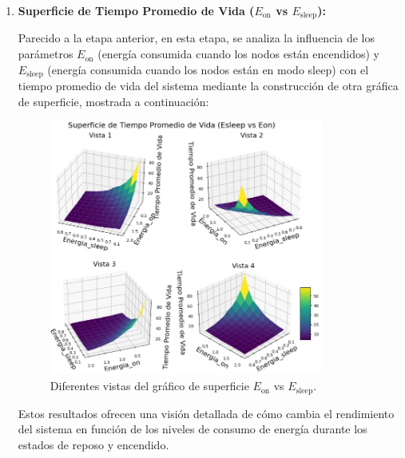 \begin{enumerate}[label=\arabic*.]
\item \textbf{Superficie de Tiempo Promedio de Vida ($E_{\text{on}}$ vs $E_{\text{sleep}}$):}

Parecido a la etapa anterior, en esta etapa, se analiza la influencia de los parámetros $E_{\text{on}}$ (energía consumida cuando los nodos están encendidos) y $E_{\text{sleep}}$ (energía consumida cuando los nodos están en modo sleep) con el tiempo promedio de vida del sistema mediante la construcción de otra gráfica de superficie, mostrada a continuación:

\begin{figure}[H]
    \centering
    \includegraphics[width=0.85\textwidth]{imagenes/mmpp7.1.jpg}
    \caption{Diferentes vistas del gráfico de superficie $E_{\text{on}}$ vs $E_{\text{sleep}}$.}
\end{figure}

Estos resultados ofrecen una visión detallada de cómo cambia el rendimiento del sistema en función de los niveles de consumo de energía durante los estados de reposo y encendido.

\end{enumerate}
\newpage


